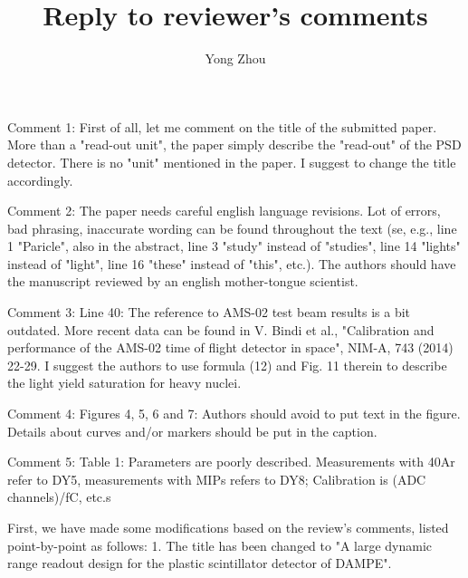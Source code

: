 \documentclass[]{article}
\title{Reply to reviewer's comments}
\author{Yong Zhou}
\begin{document}
\maketitle

\section{}
Comment 1: First of all, let me comment on the title of the submitted paper. More than a "read-out unit", the paper simply describe the "read-out" of the PSD detector. There is no "unit" mentioned in the paper. I suggest to change the title accordingly.

Comment 2: The paper needs careful english language revisions. Lot of errors, bad phrasing, inaccurate wording can be found throughout the text (se, e.g., line 1 "Paricle", also in the abstract, line 3 "study" instead of "studies", line 14 "lights" instead of "light", line 16 "these" instead of "this", etc.). The authors should have the manuscript reviewed by an english mother-tongue scientist.

Comment 3: Line 40: The reference to AMS-02 test beam results is a bit outdated. More recent data can be found in V. Bindi et al., "Calibration and performance of the AMS-02 time of flight detector in space", NIM-A, 743 (2014) 22-29. I suggest the authors to use formula (12) and Fig. 11 therein to describe the light yield saturation for heavy nuclei.

Comment 4: Figures 4, 5, 6 and 7: Authors should avoid to put text in the figure. Details about curves and/or markers should be put in the caption.

Comment 5: Table 1: Parameters are poorly described. Measurements with 40Ar refer to DY5, measurements with MIPs refers to DY8; Calibration is (ADC channels)/fC, etc.s

First, we have made some modifications based on the review's comments, listed point-by-point as follows:
1. The title has been changed to "A large dynamic range readout design for the plastic scintillator detector of DAMPE".
\end{document}
